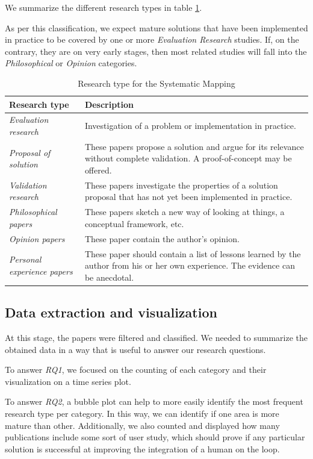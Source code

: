 We summarize the different research types in table \ref{tab:mapping/research_type}.

As per this classification, we expect mature solutions that have been
implemented in practice to be covered by one or more \emph{Evaluation Research}
studies. If, on the contrary, they are on very early stages, then most
related studies will fall into the \emph{Philosophical} or
\emph{Opinion} categories.

\begin{table}[hptb]
  \small
  \begin{tabularx}{\textwidth}{l >{\raggedright\arraybackslash}X}
    \hline
    \textbf{Research type} & \textbf{Description} \\
    \hline
    \textit{Evaluation research} & Investigation of a problem or implementation in practice. \\
    \textit{Proposal of solution} & These papers propose a solution and argue for its relevance without
      complete validation. A proof-of-concept may be offered. \\
    \textit{Validation research} & These papers investigate the properties of a solution proposal that
      has not yet been implemented in practice. \\
    \textit{Philosophical papers} & These papers sketch a new way of looking at things, a conceptual
      framework, etc. \\
    \textit{Opinion papers} & These paper contain the author's opinion. \\
    \textit{Personal experience papers} & These paper should contain a list of lessons learned by the
      author from his or her own experience. The evidence can be anecdotal. \\
  \end{tabularx}
  \caption{Research type for the Systematic Mapping}\label{tab:mapping/research_type}
\end{table}

\subsection{Data extraction and visualization}
At this stage, the papers were filtered and classified. We needed to summarize
the obtained data in a way that is useful to answer our research questions.

To answer \emph{RQ1}, we focused on the counting of each category
and their visualization on a time series plot.

To answer \emph{RQ2}, a bubble plot can help to more easily identify
the most frequent research type per category. In this way, we can identify if
one area is more mature than other. Additionally, we also counted and displayed
how many publications include some sort of user study, which should prove
if any particular solution is successful at improving the integration of a
human on the loop.

